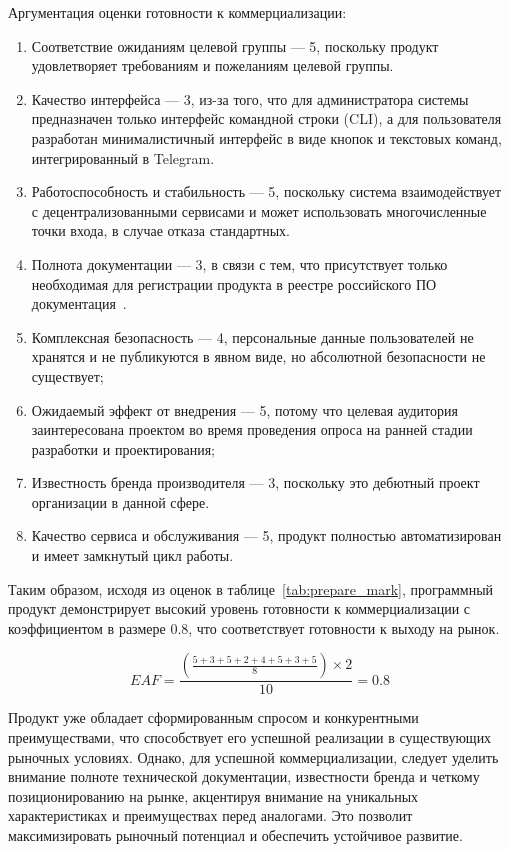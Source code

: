 Аргументация оценки готовности к коммерциализации:
\begin{enumerate}
    \item Соответствие ожиданиям целевой группы --- 5, поскольку продукт удовлетворяет требованиям и пожеланиям целевой группы.
    \item Качество интерфейса --- 3, из-за того, что для администратора системы предназначен только интерфейс командной строки (CLI), а для пользователя разработан минималистичный интерфейс в виде кнопок и текстовых команд, интегрированный в Telegram.
    \item Работоспособность и стабильность --- 5, поскольку система взаимодействует с децентрализованными сервисами и может использовать многочисленные точки входа, в случае отказа стандартных.
    \item Полнота документации --- 3, в связи с тем, что присутствует только необходимая для регистрации продукта в реестре российского ПО документация~\cite{bib:reestrpo_docs_list}.
    \item Комплексная безопасность --- 4, персональные данные пользователей не хранятся и не публикуются в явном виде, но абсолютной безопасности не существует;
    \item Ожидаемый эффект от внедрения --- 5, потому что целевая аудитория заинтересована проектом во время проведения опроса на ранней стадии разработки и проектирования;
    \item Известность бренда производителя --- 3, поскольку это дебютный проект организации в данной сфере.
    \item Качество сервиса и обслуживания --- 5, продукт полностью автоматизирован и имеет замкнутый цикл работы.
\end{enumerate}

Таким образом, исходя из оценок в таблице~\ref{tab:prepare_mark}, программный продукт демонстрирует высокий уровень готовности к коммерциализации с коэффициентом в размере 0.8, что соответствует готовности к выходу на рынок.

$$EAF = \frac{\left(\frac{5 + 3 + 5 + 2 + 4 + 5 + 3 + 5}{8}\right) \times 2}{10} = 0.8$$

Продукт уже обладает сформированным спросом и конкурентными преимуществами, что способствует его успешной реализации в существующих рыночных условиях. Однако, для успешной коммерциализации, следует уделить внимание полноте технической документации, известности бренда и четкому позиционированию на рынке, акцентируя внимание на уникальных характеристиках и преимуществах перед аналогами. Это позволит максимизировать рыночный потенциал и обеспечить устойчивое развитие.

